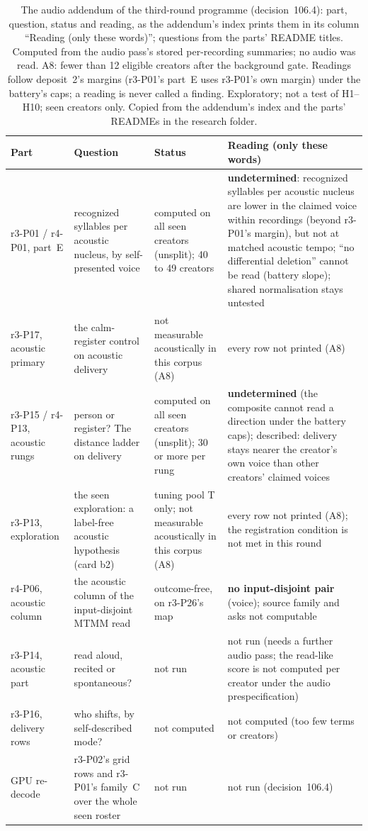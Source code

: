 \begin{table}[tp]
\centering
\footnotesize
\begin{tabular}{@{}>{\raggedright\arraybackslash}p{}>{\raggedright\arraybackslash}p{}>{\raggedright\arraybackslash}p{}p{}@{}}
\toprule
Part & Question & Status & Reading (only these words) \\
\midrule
r3-P01 / r4-P01, part~E & recognized syllables per acoustic nucleus, by self-presented voice & computed on all seen
creators (unsplit); 40 to 49 creators & \textbf{undetermined}: recognized syllables per acoustic nucleus are lower in
the claimed voice within recordings (beyond r3-P01's margin), but not at matched acoustic tempo; ``no differential
deletion'' cannot be read (battery slope); shared normalisation stays untested \\
r3-P17, acoustic primary & the calm-register control on acoustic delivery & not measurable acoustically in this corpus
(A8) & every row not printed (A8) \\
r3-P15 / r4-P13, acoustic rungs & person or register? The distance ladder on delivery & computed on all seen creators
(unsplit); 30 or more per rung & \textbf{undetermined} (the composite cannot read a direction under the battery caps);
described: delivery stays nearer the creator's own voice than other creators' claimed voices \\
r3-P13, exploration & the seen exploration: a label-free acoustic hypothesis (card b2) & tuning pool T only; not
measurable acoustically in this corpus (A8) & every row not printed (A8); the registration condition is not met in this
round \\
r4-P06, acoustic column & the acoustic column of the input-disjoint MTMM read & outcome-free, on r3-P26's map &
\textbf{no input-disjoint pair} (voice); source family and asks not computable \\
r3-P14, acoustic part & read aloud, recited or spontaneous? & not run & not run (needs a further audio pass; the
read-like score is not computed per creator under the audio prespecification) \\
r3-P16, delivery rows & who shifts, by self-described mode? & not computed & not computed (too few terms or creators) \\
GPU re-decode & r3-P02's grid rows and r3-P01's family~C over the whole seen roster & not run & not run
(decision~106.4) \\
\bottomrule
\end{tabular}
\caption{The audio addendum of the third-round programme (decision~106.4): part, question, status and reading, as the
addendum's index prints them in its column ``Reading (only these words)''; questions from the parts' README titles.
Computed from the audio pass's stored per-recording summaries; no audio was read. A8: fewer than 12 eligible creators
after the background gate. Readings follow deposit~2's margins (r3-P01's part~E uses r3-P01's own margin) under the
battery's caps; a reading is never called a finding. Exploratory; not a test of H1--H10; seen creators only. Copied from
the addendum's index and the parts' READMEs in the research folder. \LabelValidity}
\label{tab:panel3-audio-add}
\end{table}


